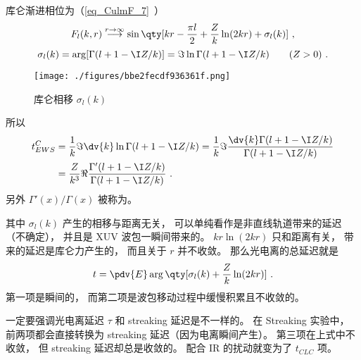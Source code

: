 库仑渐进相位为（\autoref{eq_CulmF_7}~）
\begin{equation}
F_l(k, r) \overset{r\to \infty}{\longrightarrow} \sin\qty[kr - \frac{\pi l}{2} + \frac{Z}{k}\ln(2kr) + \sigma_l(k)]~, %
\end{equation}
\begin{equation}
\sigma_l(k) = \arg[\Gamma(l+1-\I Z/k)] = \Im\ln\Gamma(l+1-\I Z/k) \qquad (Z > 0)~.
\end{equation}
\begin{figure}[ht]
\centering
\texttt{[image: ./figures/bbe2fecdf936361f.png]}
\caption{库仑相移 $\sigma_l(k)$} \label{fig_HeAna2_1}
\end{figure}

所以
\begin{equation}\label{eq_tEWS}
\begin{aligned}
t_{EWS}^C &= \frac{1}{k} \Im\dv{k}\ln\Gamma(l+1-\I Z/k) = \frac{1}{k} \Im\frac{\dv{k}\Gamma(l+1-\I Z/k)}{\Gamma(l+1-\I Z/k)}\\
&= \frac{Z}{k^3} \Re\frac{\Gamma'(l+1-\I Z/k)}{\Gamma(l+1-\I Z/k)}~.
\end{aligned}
\end{equation}
另外 $\Gamma'(x)/\Gamma(x)$ 被称为。

其中 $\sigma_l(k)$ 产生的相移与距离无关， 可以单纯看作是非直线轨道带来的延迟（不确定）， 并且是 XUV 波包一瞬间带来的。 $kr\ln(2kr)$ 只和距离有关， 带来的延迟是库仑力产生的， 而且关于 $r$ 并不收敛。 那么光电离的总延迟就是
\begin{equation}\label{eq_HeAna2_5}
t = \pdv{E} \arg\qty[\sigma_l(k) + \frac{Z}{k}\ln(2kr)]~. %
\end{equation}
第一项是瞬间的， 而第二项是波包移动过程中缓慢积累且不收敛的。

一定要强调光电离延迟 $\tau$ 和 streaking 延迟是不一样的。 在 Streaking 实验中， 前两项都会直接转换为 streaking 延迟（因为电离瞬间产生）。 第三项在上式中不收敛， 但 streaking 延迟却总是收敛的。 配合 IR 的扰动就变为了 $t_{CLC}$ 项。

